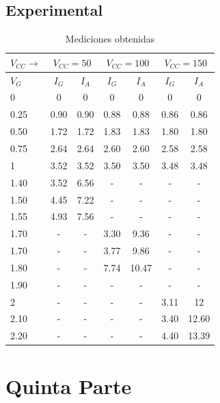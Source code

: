 \subsection{Experimental}
\begin{table}[H]
  \begin{center}
    \begin{tabular}{|l|c|c|c|c|c|c|}
      \hline
      $V_{CC}\rightarrow$ &\multicolumn{2}{|c|}{$V_{CC}=50$} &\multicolumn{2}{c|}{$V_{CC}=100$} &\multicolumn{2}{c|}{$V_{CC}=150$} \\ 
      \hline
      \hline
      $V_{G}$ &$I_G$ &$I_A$ &$I_G$ &$I_A$  &$I_G$ &$I_A$ \\ 
      \hline
      0     &0     &0    &0    &0     &0     &0      \\
      0.25  &0.90  &0.90 &0.88 &0.88  &0.86  &0.86   \\
      0.50  &1.72  &1.72 &1.83 &1.83  &1.80  &1.80   \\
      0.75  &2.64  &2.64 &2.60 &2.60  &2.58  &2.58   \\
      1     &3.52  &3.52 &3.50 &3.50  &3.48  &3.48   \\
      1.40  &3.52  &6.56 &-    &-     &-     &-      \\
      1.50  &4.45  &7.22 &-    &-     &-     &-      \\
      1.55  &4.93  &7.56 &-    &-     &-     &-      \\
      1.70  &-     &-    &3.30 &9.36  &-     &-      \\
      1.70  &-     &-    &3.77 &9.86  &-     &-      \\
      1.80  &-     &-    &7.74 &10.47 &-     &-      \\
      1.90  &-     &-    &-    &-     &-     &-      \\
      2     &-     &-    &-    &-     &3.11  &12     \\
      2.10  &-     &-    &-    &-     &3.40  &12.60  \\
      2.20  &-     &-    &-    &-     &4.40  &13.39  \\
      \hline
    \end{tabular}
  \end{center}
  \caption{Mediciones obtenidas}
\end{table}

\section{Quinta Parte}

